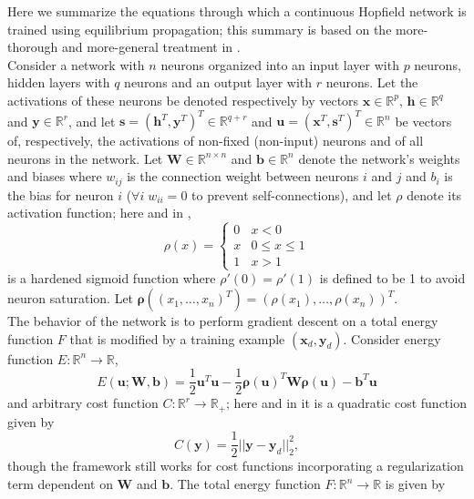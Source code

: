 \documentclass[utf8]{frontiersSCNS}
\newcommand{\mtx}[1]{\bm{#1}}
\newcommand{\npar}{\\\indent}
\begin{document}
Here we summarize the equations through which a continuous Hopfield network is trained using equilibrium propagation; this summary is based on the more-thorough and more-general treatment in \cite{scellier17}.
\npar
Consider a network with $n$ neurons organized into an input layer with $p$ neurons, hidden layers with $q$ neurons and an output layer with $r$ neurons. Let the activations of these neurons be denoted respectively by vectors $\mtx{x}\in\mathbb{R}^{p}$, $\mtx{h}\in\mathbb{R}^{q}$ and $\mtx{y}\in\mathbb{R}^{r}$, and let $\mtx{s}=(\mtx{h}^{T},\mtx{y}^{T})^{T}\in\mathbb{R}^{q+r}$ and $\mtx{u}=(\mtx{x}^{T}, \mtx{s}^{T})^{T}\in\mathbb{R}^{n}$ be vectors of, respectively, the activations of non-fixed (non-input) neurons and of all neurons in the network. Let $\mtx{W}\in\mathbb{R}^{n\times n}$ and $\mtx{b}\in\mathbb{R}^{n}$ denote the network's weights and biases where $w_{ij}$ is the connection weight between neurons $i$ and $j$ and $b_i$ is the bias for neuron $i$ ($\forall i \;w_{ii}=0$ to prevent self-connections), and let $\rho$ denote its activation function; here and in \cite{scellier17},
\begin{equation}
\label{eqn:hardened_sigmoid}
\rho(x)=\begin{cases}0&x<0\\x&0\leq x\leq 1\\1&x>1\end{cases} 
\end{equation} \sloppy is a hardened sigmoid function
where $\rho'(0)=\rho'(1)$ is defined to be 1 to avoid neuron saturation. Let $\mtx{\rho}((x_1,\hdots, x_n)^T)=(\rho(x_1),\hdots,\rho(x_n))^T$.
\npar
The behavior of the network is to perform gradient descent on a total energy function $F$ that is modified by a training example $(\mtx{x}_d,\mtx{y}_d)$. Consider energy function $E:\mathbb{R}^n\to\mathbb{R}$,
\begin{equation}
E(\mtx{u}; \mtx{W}, \mtx{b})=\frac{1}{2}\mtx{u}^T\mtx{u}-\frac{1}{2}\mtx{\rho}(\mtx{u})^T \mtx{W} \mtx{\rho}(\mtx{u})-\mtx{b}^T\mtx{u}
\label{eqn:energy}
\end{equation}
and arbitrary cost function $C:\mathbb{R}^r\to\mathbb{R}_{+}$; here and in \cite{scellier17} it is a quadratic cost function given by
\begin{equation}
\label{eqn:cost}
C(\mtx{y})=\frac{1}{2}||\mtx{y}-\mtx{y}_d||_2^2,
\end{equation}
though the framework still works for cost functions incorporating a regularization term dependent on $\mtx{W}$ and $\mtx{b}$. The total energy function $F:\mathbb{R}^n\to\mathbb{R}$ is given by
\end{document}
